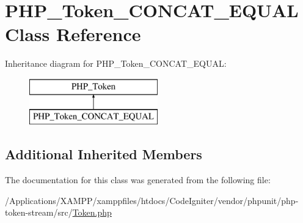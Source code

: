\hypertarget{class_p_h_p___token___c_o_n_c_a_t___e_q_u_a_l}{}\section{P\+H\+P\+\_\+\+Token\+\_\+\+C\+O\+N\+C\+A\+T\+\_\+\+E\+Q\+U\+AL Class Reference}
\label{class_p_h_p___token___c_o_n_c_a_t___e_q_u_a_l}
Inheritance diagram for P\+H\+P\+\_\+\+Token\+\_\+\+C\+O\+N\+C\+A\+T\+\_\+\+E\+Q\+U\+AL\+:\begin{figure}[H]
\begin{center}
\leavevmode
\includegraphics[height=2.000000cm]{class_p_h_p___token___c_o_n_c_a_t___e_q_u_a_l}
\end{center}
\end{figure}
\subsection*{Additional Inherited Members}


The documentation for this class was generated from the following file\+:\begin{DoxyCompactItemize}
\item 
/\+Applications/\+X\+A\+M\+P\+P/xamppfiles/htdocs/\+Code\+Igniter/vendor/phpunit/php-\/token-\/stream/src/\mbox{\hyperlink{_token_8php}{Token.\+php}}\end{DoxyCompactItemize}
